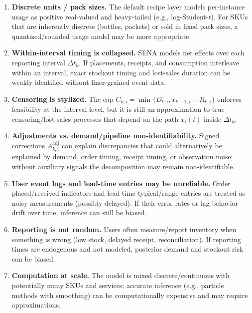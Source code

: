 \documentclass[11pt]{article}
\begin{document}
\begin{enumerate}
  \item \textbf{Discrete units / pack sizes.} The default recipe layer models per-instance usage as positive real-valued and heavy-tailed (e.g., log-Student-$t$). For SKUs that are inherently discrete (bottles, packets) or sold in fixed pack sizes, a quantized/rounded usage model may be more appropriate.

  \item \textbf{Within-interval timing is collapsed.} SENA models net effects over each reporting interval $\Delta t_k$. If placements, receipts, and consumption interleave within an interval, exact stockout timing and lost-sales duration can be weakly identified without finer-grained event data.

  \item \textbf{Censoring is stylized.} The cap $C_{k,i}=\min\{D_{k,i},x_{k-1,i}+R_{k,i}\}$ enforces feasibility at the interval level, but it is still an approximation to true censoring/lost-sales processes that depend on the path $x_i(t)$ inside $\Delta t_k$.

  \item \textbf{Adjustments vs. demand/pipeline non-identifiability.} Signed corrections $A^{\mathrm{adj}}_{k,i}$ can explain discrepancies that could alternatively be explained by demand, order timing, receipt timing, or observation noise; without auxiliary signals the decomposition may remain non-identifiable.

  \item \textbf{User event logs and lead-time entries may be unreliable.} Order placed/received indicators and lead-time typical/range entries are treated as noisy measurements (possibly delayed). If their error rates or lag behavior drift over time, inference can still be biased.

  \item \textbf{Reporting is not random.} Users often measure/report inventory when something is wrong (low stock, delayed receipt, reconciliation). If reporting times are endogenous and not modeled, posterior demand and stockout risk can be biased.

  \item \textbf{Computation at scale.} The model is mixed discrete/continuous with potentially many SKUs and services; accurate inference (e.g., particle methods with smoothing) can be computationally expensive and may require approximations.
\end{enumerate}
\end{document}
